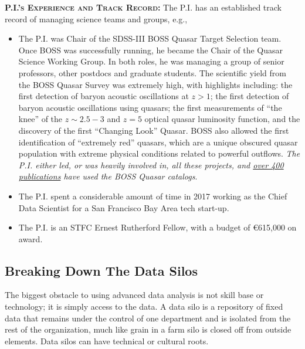 \documentclass[oneside, a4paper, onecolumn, 11pt]{article}
\begin{document}
\textbf{\textsc{\textcolor{Cerulean}{P.I.'s Experience and Track Record:}}}
The P.I. has an established track record of managing science teams and groups, e.g., 

\begin{itemize}
\item The P.I. was Chair of the SDSS-III BOSS Quasar Target
Selection team. Once BOSS was successfully running, he became the Chair
of the Quasar Science Working Group. In both roles, he was managing a
group of senior professors, other postdocs and graduate students.
The scientific yield from the BOSS Quasar Survey was extremely high,
with highlights including: the first detection of baryon acoustic
oscillations at $z>1$; the first detection of baryon acoustic
oscillations using quasars; the first measurements of ``the knee'' of
the $z\sim2.5-3$ and $z=5$ optical quasar luminosity function, and the
discovery of the first ``Changing Look'' Quasar.  BOSS also allowed
the first identification of ``extremely red'' quasars, which are a
unique obscured quasar population with extreme physical conditions
related to powerful outflows. {\it The P.I. either led, or was heavily
involved in, all these projects, and \href{https://tinyurl.com/ycxd8lb6}{over 400 publications} have used
the BOSS Quasar catalogs}.

\item The P.I. spent a considerable amount of time in 2017 working as the
Chief Data Scientist for a San Francisco Bay Area tech start-up. 

\item The P.I. is an STFC Ernest Rutherford Fellow, with a budget of \euro615,000 on award. 


\end{itemize}

\subsection*{Breaking Down The Data Silos}
The biggest obstacle to using advanced data analysis is not skill base or technology; it is simply access to the data.
A data silo is a repository of fixed data that remains under the
control of one department and is isolated from the rest of the
organization, much like grain in a farm silo is closed off from
outside elements. Data silos can have technical or cultural roots.
\end{document}
